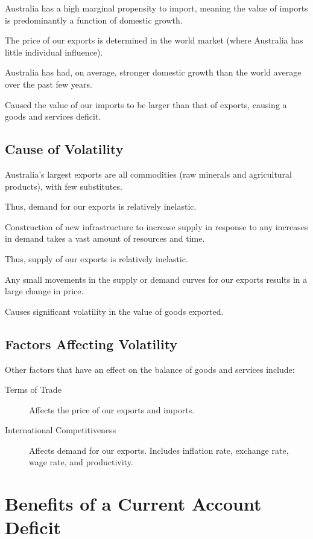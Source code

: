\documentclass[a4paper,11pt]{article}
\begin{document}
Australia has a high marginal propensity to import, meaning the value of
imports is predominantly a function of domestic growth.

The price of our exports is determined in the world market (where Australia has
little individual influence).

Australia has had, on average, stronger domestic growth than the world average
over the past few years.

Caused the value of our imports to be larger than that of exports, causing a
goods and services deficit.


\subsection{Cause of Volatility}

Australia's largest exports are all commodities (raw minerals and agricultural
products), with few substitutes.

Thus, demand for our exports is relatively inelastic.

Construction of new infrastructure to increase supply in response to any
increases in demand takes a vast amount of resources and time.

Thus, supply of our exports is relatively inelastic.

Any small movements in the supply or demand curves for our exports results in
a large change in price.

Causes significant volatility in the value of goods exported.


\subsection{Factors Affecting Volatility}

Other factors that have an effect on the balance of goods and services include:

\begin{description}
\item [Terms of Trade] Affects the price of our exports and imports.
\item [International Competitiveness] Affects demand for our exports. Includes
	inflation rate, exchange rate, wage rate, and productivity.
\end{description}




\section{Benefits of a Current Account Deficit}
\end{document}
